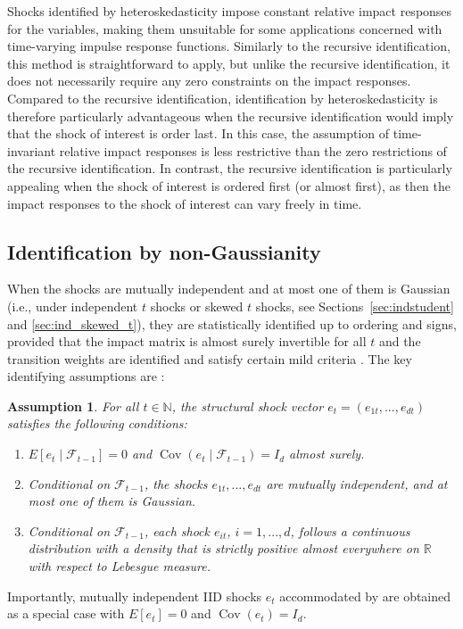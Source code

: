 \documentclass[nojss]{jss}
\newtheorem{assumption}{Assumption}
\begin{document}
Shocks identified by heteroskedasticity impose constant relative impact responses for the variables, making them unsuitable for some applications concerned with time-varying impulse response functions. Similarly to the recursive identification, this method is straightforward to apply, but unlike the recursive identification, it does not necessarily require any zero constraints on the impact responses. Compared to the recursive identification, identification by heteroskedasticity is therefore particularly advantageous when the recursive identification would imply that the shock of interest is order last. In this case, the assumption of time-invariant relative impact responses is less restrictive than the zero restrictions of the recursive identification. In contrast, the recursive identification is particularly appealing when the shock of interest is ordered first (or almost first), as then the impact responses to the shock of interest can vary freely in time.

\subsection{Identification by non-Gaussianity}\label{sec:ident_non_gauss}

When the shocks are mutually independent and at most one of them is Gaussian (i.e., under independent $t$ shocks or skewed $t$ shocks, see Sections~\ref{sec:indstudent} and \ref{sec:ind_skewed_t}), they are statistically identified up to ordering and signs, provided that the impact matrix is almost surely invertible for all $t$ and the transition weights are identified and satisfy certain mild criteria \citep{Virolainen2:2024}. The key identifying assumptions are \citep[Assumption~1 of][]{Virolainen2:2024}:
\begin{assumption}\label{as:shocks}
For all $t\in\mathbb{N}$, the structural shock vector $e_t=(e_{1t},...,e_{dt})$ satisfies the following conditions:
\begin{enumerate}%
\item $E[e_t \mid \mathcal{F}_{t-1}] = 0$ and $\operatorname{Cov}(e_t \mid \mathcal{F}_{t-1}) = I_d$ almost surely.\label{cond:condmean}
\item Conditional on $\mathcal{F}_{t-1}$, the shocks $e_{1t},...,e_{dt}$ are mutually independent, and at most one of them is Gaussian.\label{cond:mutualindep}
\item Conditional on $\mathcal{F}_{t-1}$, each shock $e_{it}$, $i=1,...,d$, follows a continuous distribution with a density that is strictly positive almost everywhere on $\mathbb{R}$ with respect to Lebesgue measure.\label{cond:regularity}
\end{enumerate}
\end{assumption}
%
Importantly, mutually independent IID shocks $e_t$ accommodated by  are obtained as a special case with $E[e_t]=0$ and $\operatorname{Cov}(e_t)=I_d$.
\end{document}
